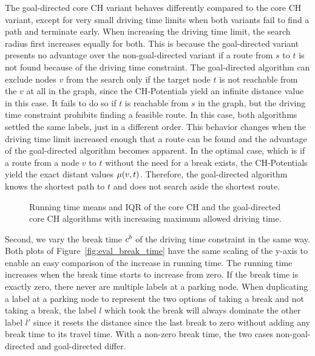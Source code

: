 The goal-directed core CH variant behaves differently compared to the core CH variant, except for very small driving time limits when both variants fail to find a path and terminate early. When increasing the driving time limit, the search radius first increases equally for both. This is because the goal-directed variant presents no advantage over the non-goal-directed variant if a route from $s$ to $t$ is not found because of the driving time constraint. The goal-directed algorithm can exclude nodes $v$ from the search only if the target node $t$ is not reachable from the $v$ at all in the graph, since the CH-Potentials yield an infinite distance value in this case. It fails to do so if $t$ is reachable from $s$ in the graph, but the driving time constraint prohibits finding a feasible route. In this case, both algorithms settled the same labels, just in a different order. This behavior changes when the driving time limit increased enough that a route can be found and the advantage of the goal-directed algorithm becomes apparent. In the optimal case, which is if a route from a node $v$ to $t$ without the need for a break exists, the CH-Potentials yield the exact distant values $\mu(v,t)$. Therefore, the goal-directed algorithm knows the shortest path to $t$ and does not search aside the shortest route.

\begin{figure}[hbtp]
	\centering
	\hfill
	\caption{Running time means and IQR of the core CH and the goal-directed core CH algorithms with increasing maximum allowed driving time.}
	\label{fig:eval_driving_time}
\end{figure}

Second, we vary the break time $c^b$ of the driving time constraint in the same way. Both plots of Figure~\ref{fig:eval_break_time} have the same scaling of the y-axis to enable an easy comparison of the increase in running time. The running time increases when the break time starts to increase from zero. If the break time is exactly zero, there never are multiple labels at a parking node. When duplicating a label at a parking node to represent the two options of taking a break and not taking a break, the label $l$ which took the break will always dominate the other label $l'$ since it resets the distance since the last break to zero without adding any break time to its travel time. With a non-zero break time, the two cases non-goal-directed and goal-directed differ.

